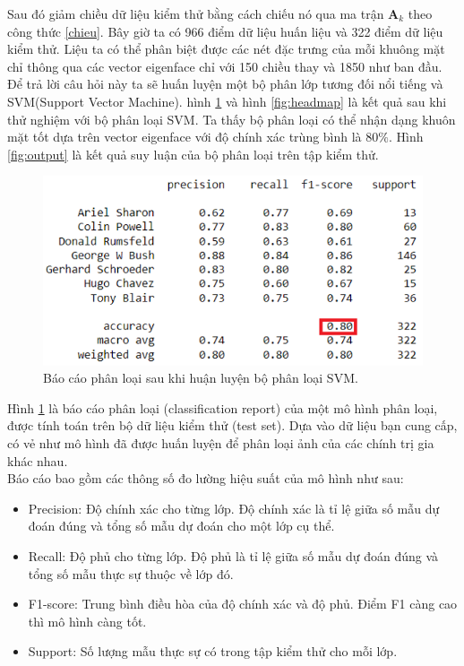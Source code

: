 \documentclass[12pt,a4paper,oneside]{report}
\numberwithin{equation}{section}
\begin{document}
Sau đó giảm chiều dữ liệu kiểm thử bằng cách chiếu nó qua ma trận $\mathbf{A}_k$ theo công thức \ref{chieu}.
Bây giờ ta có 966 điểm dữ liệu huấn liệu và 322 điểm dữ liệu kiểm thử. Liệu ta có thể phân biệt được các nét đặc trưng của mỗi khuông mặt chỉ thông qua các vector eigenface chỉ với 150 chiều thay và 1850 như ban đầu.
Để trả lời câu hỏi này ta sẽ huấn luyện một bộ phân lớp tương đối nổi tiếng và SVM(Support Vector Machine)\cite{cristianini2000}.
hình \ref{fig:svm_result} và hình \ref{fig:headmap}  là kết quả sau khi thử nghiệm với bộ phân loại SVM. Ta thấy bộ phân loại có thể nhận dạng khuôn mặt tốt dựa trên vector eigenface với độ chính xác trùng bình là $80\%$. Hình \ref{fig:output} là kết quả suy luận của bộ phân loại trên tập kiểm thử.
\begin{figure}[htp]
	\centering
	\includegraphics[scale=0.8]{result_svm.png}
	\caption{Báo cáo phân loại sau khi huận luyện bộ phân loại SVM.}
	\label{fig:svm_result}
\end{figure}
Hình \ref{fig:svm_result} là báo cáo phân loại (classification report) của một mô hình phân loại, được tính toán trên bộ dữ liệu kiểm thử (test set). Dựa vào dữ liệu bạn cung cấp, có vẻ như mô hình đã được huấn luyện để phân loại ảnh của các chính trị gia khác nhau.\\
Báo cáo bao gồm các thông số đo lường hiệu suất của mô hình như sau:
\begin{itemize}
\item Precision: Độ chính xác cho từng lớp. Độ chính xác là tỉ lệ giữa số mẫu dự đoán đúng và tổng số mẫu dự đoán cho một lớp cụ thể.

\item Recall: Độ phủ cho từng lớp. Độ phủ là tỉ lệ giữa số mẫu dự đoán đúng và tổng số mẫu thực sự thuộc về lớp đó.

\item F1-score: Trung bình điều hòa của độ chính xác và độ phủ. Điểm F1 càng cao thì mô hình càng tốt.

\item Support: Số lượng mẫu thực sự có trong tập kiểm thử cho mỗi lớp.
\end{itemize}
\end{document}
